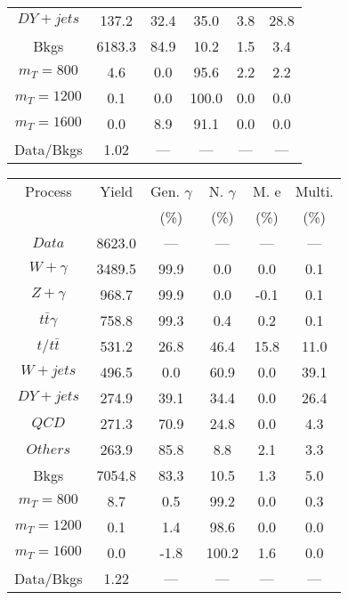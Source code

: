\begin{figure}
\begin{minipage}[c]{0.32\textwidth}
{\begin{tabular}{cccccc}
$ DY+jets $ &  137.2 &  32.4 &  35.0 &  3.8 &  28.8\\
Bkgs &  6183.3 &  84.9 &  10.2 &  1.5 &  3.4\\
$ m_{T} = 800 $ &  4.6 &  0.0 &  95.6 &  2.2 &  2.2\\
$ m_{T} = 1200 $ &  0.1 &  0.0 &  100.0 &  0.0 &  0.0\\
$ m_{T} = 1600 $ &  0.0 &  8.9 &  91.1 &  0.0 &  0.0\\
Data/Bkgs &  1.02 &  --- &  --- &  --- &  ---\\
\hline
\end{tabular}
}
\end{minipage}
\begin{minipage}[c]{0.32\textwidth}
\centering
\tiny{
\begin{tabular}{cccccc}
\hline
Process & Yield & Gen. $\gamma$ & N. $\gamma$ & M. e & Multi. \\
 &  & (\%) & (\%) & (\%) & (\%)  \\
\hline
                                                                      $ Data $ &  8623.0 &  --- &  --- &  --- &  ---\\
$ W+\gamma $ &  3489.5 &  99.9 &  0.0 &  0.0 &  0.1\\
$ Z+\gamma $ &  968.7 &  99.9 &  0.0 &  -0.1 &  0.1\\
$ t\bar{t}\gamma $ &  758.8 &  99.3 &  0.4 &  0.2 &  0.1\\
$ t/t\bar{t} $ &  531.2 &  26.8 &  46.4 &  15.8 &  11.0\\
$ W+jets $ &  496.5 &  0.0 &  60.9 &  0.0 &  39.1\\
$ DY+jets $ &  274.9 &  39.1 &  34.4 &  0.0 &  26.4\\
$ QCD $ &  271.3 &  70.9 &  24.8 &  0.0 &  4.3\\
$ Others $ &  263.9 &  85.8 &  8.8 &  2.1 &  3.3\\
Bkgs &  7054.8 &  83.3 &  10.5 &  1.3 &  5.0\\
$ m_{T} = 800 $ &  8.7 &  0.5 &  99.2 &  0.0 &  0.3\\
$ m_{T} = 1200 $ &  0.1 &  1.4 &  98.6 &  0.0 &  0.0\\
$ m_{T} = 1600 $ &  0.0 &  -1.8 &  100.2 &  1.6 &  0.0\\
Data/Bkgs &  1.22 &  --- &  --- &  --- &  ---\\
\hline
\end{tabular}
}
\end{minipage}
\begin{minipage}[c]{0.32\textwidth}
\centering

\end{minipage}
\end{figure}

